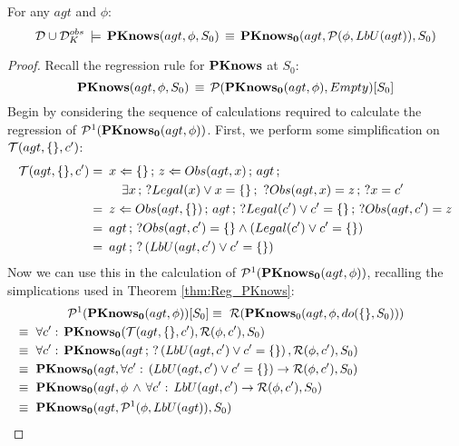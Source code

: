 \begin{lemmaext}
[\ref{lem:Pknows_LbU_S0}] For any $agt$ and $\phi$:\[
\mathcal{D}\cup\mathcal{D}_{K}^{obs}\,\models\,\mathbf{PKnows}(agt,\phi,S_{0})\,\equiv\,\mathbf{PKnows_{0}}(agt,\mathcal{P}(\phi,LbU(agt)),S_{0})\]

\end{lemmaext}
\begin{proof}
Recall the regression rule for $\mathbf{PKnows}$ at $S_{0}$:\[
\mathbf{PKnows}(agt,\phi,S_{0})\,\equiv\,\mathcal{P}(\mathbf{PKnows_{0}}(agt,\phi),Empty)[S_{0}]\]
 Begin by considering the sequence of calculations required to calculate
the regression of $\mathcal{P}^{1}(\mathbf{PKnows_{0}}(agt,\phi))$. First, we perform
some simplification on $\mathcal{T}(agt,\{\},c')$:\begin{align*}
\mathcal{T}(agt,\{\},c')=\,\,\, & x\Leftarrow\{\}\,;\, z\Leftarrow Obs(agt,x)\,;\, agt\,;\\
 & \,\,\,\,\,\,\exists x\,;\,?Legal(x)\vee x=\{\}\,;\,\,?Obs(agt,x)=z\,;\,?x=c'\\
=\,\,\, & z\Leftarrow Obs(agt,\{\})\,;\, agt\,;\,?Legal(c')\vee c'=\{\}\,;\,?Obs(agt,c')=z\\
=\,\,\, & agt\,;\,?Obs(agt,c')=\{\}\wedge\left(Legal(c')\vee c'=\{\}\right)\\
=\,\,\, & agt\,;\,?\left(LbU(agt,c')\vee c'=\{\}\right)\end{align*}
 Now we can use this in the calculation of $\mathcal{P}^{1}(\mathbf{PKnows_{0}}(agt,\phi))$,
recalling the simplications used in Theorem \ref{thm:Reg_PKnows}:\begin{multline*}
\Pst^{1}(\PKnowsZ(agt,\phi))[S_{0}]\equiv\,\,\Reg(\PKnows_{0}(agt,\phi,do(\{\},S_{0})))\\
\shoveleft{\equiv\,\,\forall c':\,\PKnowsZ(\Trn(agt,\{\},c'),\Reg(\phi,c'),S_{0})}\\
\shoveleft{\equiv\,\,\forall c':\,\PKnowsZ(agt\,;\,?\left(\LbU(agt,c')\vee c'=\{\}\right),\Reg(\phi,c'),S_{0})}\\
\shoveleft{\equiv\,\,\PKnowsZ(agt,\forall c':\,\left(\LbU(agt,c')\vee c'=\{\}\right)\rightarrow\Reg(\phi,c'),S_{0})}\\
\shoveleft{\equiv\,\,\PKnowsZ(agt,\phi\,\wedge\,\forall c':\, LbU(agt,c')\rightarrow\Reg(\phi,c'),S_{0})}\\
\shoveleft{\equiv\,\,\PKnowsZ(agt,\Pst^{1}(\phi,\LbU(agt)),S_{0})}\,\,\,\,\,\,\,\,\,\,\,\,\,\,\,\,\,\,\,\,\,\,\,\,\,\,\,\,\,\,\,\,\,\,\,\,\,\,\,\,\,\,\,\,\,\,\,\,\,\,\,\,\,\,\,\,\,\,\,\,\,\,\,\,\,\,\,\,\,\,\,\,\,\,\,\,\,\,\,\,\,\,\,\,\,\,\,\,\,\,\,\,\,\,\,\,\,\,\,\,\,\,\,\,\,\,\,\,\,\,\,\,\,\end{multline*}
 


\end{proof}
